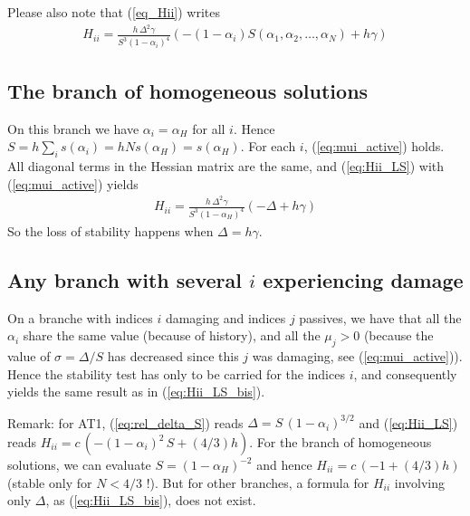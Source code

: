 \documentclass[final,3p,times,authoryear]{elsarticle}
\begin{document}
Please also note that (\ref{eq_Hii}) writes
\begin{align}
\label{eq:Hii_LS}
H_{ii} = \frac{h \, \Delta^2 \gamma}{S^3 (1-\alpha_i)^4} \left( -(1-\alpha_i) S(\alpha_1, \alpha_2, \ldots, \alpha_N) + h \gamma \right)
\end{align}

\subsection{The branch of homogeneous solutions}
On this branch we have $\alpha_i = \alpha_H$ for all $i$.
Hence $S=h \sum_i s(\alpha_i) = h N s(\alpha_H)=s(\alpha_H)$.
For each $i$, (\ref{eq:mui_active}) holds.
All diagonal terms in the Hessian matrix are the same, and (\ref{eq:Hii_LS}) with (\ref{eq:mui_active}) yields
\begin{align}
\label{eq:Hii_LS_bis}
H_{ii} = \frac{h \, \Delta^2 \gamma}{S^3 (1-\alpha_H)^4} \left( -\Delta + h \gamma \right)
\end{align}
So the loss of stability happens when $\Delta = h \gamma$.

\subsection{Any branch with several $i$ experiencing damage}
On a branche with indices $i$ damaging and indices $j$ passives, we have that all the $\alpha_i$ share the same value (because of history), and all the $\mu_j>0$ (because the value of $\sigma=\Delta/S$ has decreased since this $j$ was damaging, see (\ref{eq:mui_active})). 
Hence the stability test has only to be carried for the indices $i$, and consequently yields the same result as in (\ref{eq:Hii_LS_bis}).

Remark: for AT1, (\ref{eq:rel_delta_S}) reads $\Delta = S \, (1-\alpha_i)^{3/2}$ and (\ref{eq:Hii_LS}) reads $H_{ii} = c \, (-(1-\alpha_i)^2 \, S + (4/3) h)$. 
For the branch of homogeneous solutions, we can evaluate $S=(1-\alpha_H)^{-2}$ and hence $H_{ii} = c \, (-1 + (4/3) h)$ (stable only for $N<4/3$ !).
But for other branches, a formula for $H_{ii}$ involving  only $\Delta$, as (\ref{eq:Hii_LS_bis}), does not exist.







%
%
%
%
%
%
%
%
%





\end{document}
